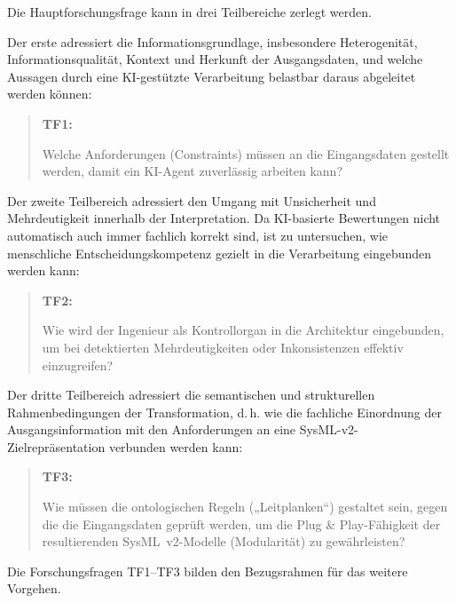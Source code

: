 Die Hauptforschungsfrage kann in drei Teilbereiche zerlegt werden.

Der erste adressiert die Informationsgrundlage, insbesondere Heterogenität,
Informationsqualität, Kontext und Herkunft der Ausgangsdaten, und welche
Aussagen durch eine KI-gestützte Verarbeitung belastbar daraus abgeleitet
werden können:

\begin{quote}
\textbf{TF1:}

Welche Anforderungen (Constraints) müssen an die Eingangsdaten gestellt
werden, damit ein KI-Agent zuverlässig arbeiten kann?
\end{quote}

Der zweite Teilbereich adressiert den Umgang mit Unsicherheit und
Mehrdeutigkeit innerhalb der Interpretation. Da KI-basierte Bewertungen nicht
automatisch auch immer fachlich korrekt sind, ist zu untersuchen, wie
menschliche Entscheidungskompetenz gezielt in die Verarbeitung eingebunden
werden kann:

\begin{quote}
\textbf{TF2:}

Wie wird der Ingenieur als Kontrollorgan in die Architektur eingebunden,
um bei detektierten Mehrdeutigkeiten oder Inkonsistenzen effektiv
einzugreifen?
\end{quote}

Der dritte Teilbereich adressiert die semantischen und strukturellen
Rahmenbedingungen der Transformation, d.\,h. wie die fachliche Einordnung der
Ausgangsinformation mit den Anforderungen an eine SysML-v2-Zielrepräsentation
verbunden werden kann:

\begin{quote}
\textbf{TF3:}

Wie müssen die ontologischen Regeln („Leitplanken“) gestaltet sein, gegen
die die Eingangsdaten geprüft werden, um die Plug \& Play-Fähigkeit der
resultierenden SysML~v2-Modelle (Modularität) zu gewährleisten?
\end{quote}

Die Forschungsfragen TF1--TF3 bilden den Bezugsrahmen für das weitere
Vorgehen.
